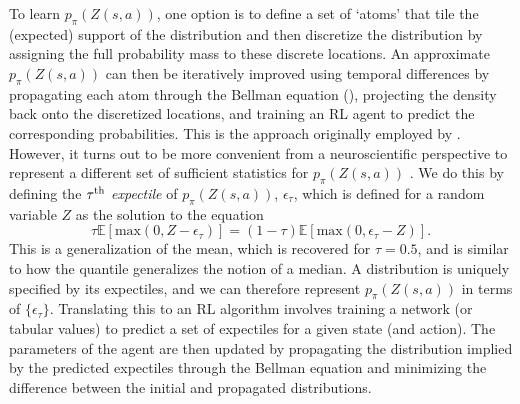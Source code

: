 To learn $p_\pi(Z(s, a))$, one option is to define a set of `atoms' that tile the (expected) support of the distribution and then discretize the distribution by assigning the full probability mass to these discrete locations.
An approximate $p_\pi(Z(s, a))$ can then be iteratively improved using temporal differences by propagating each atom through the Bellman equation (), projecting the density back onto the discretized locations, and training an RL agent to predict the corresponding probabilities.
This is the approach originally employed by \citet{bellemare2017distributional}.
However, it turns out to be more convenient from a neuroscientific perspective to represent a different set of sufficient statistics for $p_\pi(Z(s, a))$ \citep{dabney2020distributional,lowet2020distributional}.
We do this by defining the $\tau\textsuperscript{th}$ \emph{expectile} of $p_\pi(Z(s, a))$, $\epsilon_\tau$, which is defined for a random variable $Z$ as the solution to the equation
\begin{equation}
    \tau \mathbb{E} [\text{max}(0, Z - \epsilon_\tau)] = (1-\tau) \mathbb{E} [\text{max}(0, \epsilon_\tau - Z)].
\end{equation}
This is a generalization of the mean, which is recovered for $\tau = 0.5$, and is similar to how the quantile generalizes the notion of a median.
A distribution is uniquely specified by its expectiles, and we can therefore represent $p_\pi(Z(s, a))$ in terms of $\{\epsilon_\tau\}$.
Translating this to an RL algorithm involves training a network (or tabular values) to predict a set of expectiles for a given state (and action).
The parameters of the agent are then updated by propagating the distribution implied by the predicted expectiles through the Bellman equation and minimizing the difference between the initial and propagated distributions.

